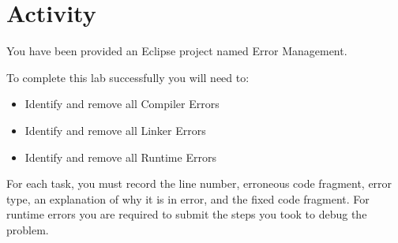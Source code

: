 \section{Activity}

You have been provided an Eclipse project named Error Management.

To complete this lab successfully you will need to:
\begin{itemize}
\item Identify and remove all Compiler Errors
\item Identify and remove all Linker Errors
\item Identify and remove all Runtime Errors
\end{itemize}
For each task, you must record the line number, erroneous code fragment, error type, an explanation of why it is in error, and the fixed code fragment. For runtime errors you are required to submit the steps you took to debug the problem.